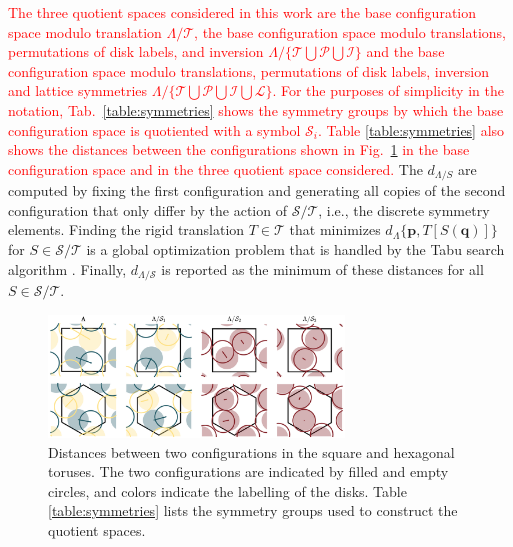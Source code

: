 \documentclass[default,iicol]{sn-jnl}%
\theoremstyle{thmstyleone}%
\theoremstyle{thmstyletwo}%
\theoremstyle{thmstylethree}%
\providecommand{\config}[1]{\mathbf{#1}}
\providecommand{\red}[1]{\textcolor{red}{#1}}
\begin{document}
\red{The three quotient spaces considered in this work are the base configuration space modulo translation $\Lambda/\mathcal{T}$, the base configuration space modulo translations, permutations of disk labels, and inversion $\Lambda/\{\mathcal{T} \bigcup \mathcal{P} \bigcup \mathcal{I}\}$ and the base configuration space modulo translations, permutations of disk labels, inversion and lattice symmetries $\Lambda/\{\mathcal{T} \bigcup \mathcal{P} \bigcup \mathcal{I} \bigcup \mathcal{L}\}$. For the purposes of simplicity in the notation, Tab.\ \ref{table:symmetries} shows the symmetry groups by which the base configuration space is quotiented with a symbol $\mathcal{S}_{i}$. Table \ref{table:symmetries} also shows the distances between the configurations shown in Fig.\ \ref{fig:figure4} in the base configuration space and in the three quotient space considered.} The $d_{\Lambda / S}$ are computed by fixing the first configuration and generating all copies of the second configuration that only differ by the action of $\mathcal{S / T}$, i.e., the discrete symmetry elements. Finding the rigid translation $T \in \mathcal{T}$ that minimizes $d_\Lambda\{\config{p}, T[S(\config{q})]\}$ for $S \in \mathcal{S / T}$ is a global optimization problem that is handled by the Tabu search algorithm \cite{chelouah2000tabu,glover1989tabu}. Finally, $d_{\Lambda / \mathcal{S}}$ is reported as the minimum of these distances for all $S \in \mathcal{S / T}$.

\begin{figure}
	\centering
	\includegraphics[width=0.7\textwidth]{figure4.png}
	\caption{Distances between two configurations in the square and hexagonal toruses. The two configurations are indicated by filled and empty circles, and colors indicate the labelling of the disks. Table \ref{table:symmetries} lists the symmetry groups used to construct the quotient spaces.}
	\label{fig:figure4}
\end{figure}
\end{document}
